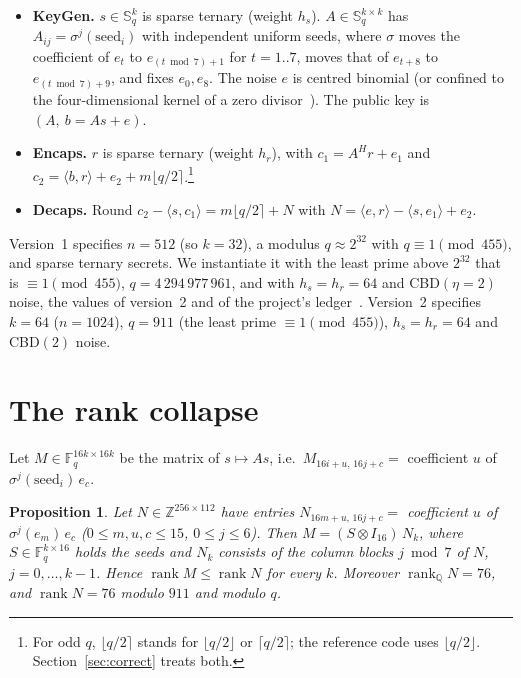 \documentclass[11pt]{article}
\newtheorem{proposition}{Proposition}
\theoremstyle{remark}
\newcommand{\F}{\mathbb{F}}
\newcommand{\Sed}{\mathbb{S}}
\DeclareMathOperator{\rank}{rank}
\begin{document}
\begin{itemize}
\item \textbf{KeyGen.} $s\in\Sed_q^k$ is sparse ternary (weight $h_s$). $A\in\Sed_q^{k\times k}$ has
  $A_{ij}=\sigma^{j}(\mathrm{seed}_i)$ with independent uniform seeds, where $\sigma$ moves the coefficient of $e_t$ to
  $e_{(t\bmod7)+1}$ for $t=1..7$, moves that of $e_{t+8}$ to $e_{(t\bmod7)+9}$, and fixes $e_0,e_8$. The noise $e$ is
  centred binomial (or confined to the four-dimensional kernel of a zero divisor~\cite{Moreno}). The public key is $(A,\ b=As+e)$.
\item \textbf{Encaps.} $r$ is sparse ternary (weight $h_r$), with $c_1=A^{H}r+e_1$ and
  $c_2=\langle b,r\rangle+e_2+m\lfloor q/2\rceil$.\footnote{For odd $q$, $\lfloor q/2\rceil$ stands for $\lfloor q/2\rfloor$ or $\lceil q/2\rceil$; the
  reference code uses $\lfloor q/2\rfloor$. Section~\ref{sec:correct} treats both.}
\item \textbf{Decaps.} Round $c_2-\langle s,c_1\rangle=m\lfloor q/2\rceil+N$ with
  $N=\langle e,r\rangle-\langle s,e_1\rangle+e_2$.
\end{itemize}
Version~1 specifies $n=512$ (so $k=32$), a modulus $q\approx2^{32}$ with $q\equiv1\pmod{455}$, and sparse ternary
secrets. We instantiate it with the least prime above $2^{32}$ that is $\equiv1\pmod{455}$, $q=4\,294\,977\,961$, and
with $h_s=h_r=64$ and CBD$(\eta=2)$ noise, the values of version~2 and of the project's ledger~\cite{Led}. Version~2
specifies $k=64$ ($n=1024$), $q=911$ (the least prime $\equiv1\pmod{455}$), $h_s=h_r=64$ and CBD$(2)$ noise.

\section{The rank collapse}\label{sec:rank}

Let $M\in\F_q^{16k\times16k}$ be the matrix of $s\mapsto As$, i.e.\ $M_{16i+u,\,16j+c}=$ coefficient $u$ of
$\sigma^{j}(\mathrm{seed}_i)\,e_c$.

\begin{proposition}\label{prop:rank}
Let $N\in\mathbb{Z}^{256\times112}$ have entries $N_{16m+u,\,16j+c}=$ coefficient $u$ of $\sigma^{j}(e_m)\,e_c$
($0\le m,u,c\le15$, $0\le j\le6$). Then $M=(S\otimes I_{16})\,N_k$, where $S\in\F_q^{k\times16}$ holds the seeds and
$N_k$ consists of the column blocks $j\bmod 7$ of $N$, $j=0,\dots,k-1$. Hence $\rank M\le\rank N$ for every $k$.
Moreover $\rank_{\mathbb{Q}}N=76$, and $\rank N=76$ modulo $911$ and modulo $q$.
\end{proposition}
\end{document}
